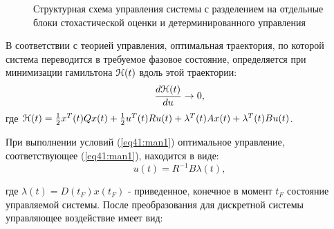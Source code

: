 \begin{figure}[!h]

\centering
{} 
\caption{Структурная схема управления системы с разделением на отдельные блоки стохастической оценки и детерминированного управления}
\label{fig:man_stat}
\end{figure}

В соответствии с теорией управления, оптимальная траектория, по которой система переводится в требуемое фазовое состояние, определяется при минимизации гамильтона $\EuScript{H}(t)$ вдоль этой траектории:
\begin{equation}\label{eq41:man1}
\frac{d\EuScript{H}(t)}{du}\rightarrow0,
\end{equation}
\noindent где $\EuScript{H}(t)=\frac{1}{2}x^T(t)Qx(t)+\frac{1}{2}u^T(t)Ru(t)+\lambda^T(t)Ax(t)+\lambda^T(t)Bu(t)$.

При выполнении условий (\ref{eq41:man1}) оптимальное управление, соответствующее (\ref{eq41:man1}), находится в виде:
\begin{equation}\label{eq41:man2}
u(t)=R^{-1}B\lambda(t),
\end{equation}

\noindent где $\lambda (t)=D(t_F)x(t_F)$ - приведенное, конечное в момент $t_F$ состояние управляемой системы.
После преобразования для дискретной системы управляющее воздействие имеет вид:

